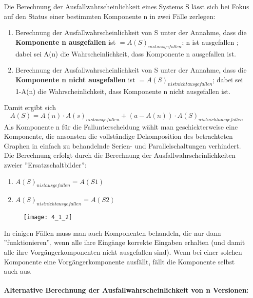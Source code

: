 Die Berechnung der Ausfallwahrscheinlichkeit eines Systems S lässt sich bei Fokus auf den Status einer bestimmten Komponente n in zwei Fälle zerlegen:
\begin{enumerate}
	\item Berechnung der Ausfallwahrscheinlichkeit von S unter der Annahme, dass die \textbf{Komponente n ausgefallen} ist $=A(S)_{n ist ausgefallen}$; n ist ausgefallen  ; dabei sei A(n) die Wahrscheinlichkeit, dass Komponente n ausgefallen ist.
	\item Berechnung der Ausfallwahrscheinlichkeit von S unter der Annahme, dass die \textbf{Komponente n nicht ausgefallen} ist $=A(S)_{n ist nicht ausgefallen}$; dabei sei 1-A(n) die Wahrscheinlichkeit, dass Komponente n nicht ausgefallen ist.
\end{enumerate}
Damit ergibt sich 
\begin{equation}
	A(S)=A(n) \cdot A(s)_{n ist ausgefallen} + (a-A(n)) \cdot A(S)_{n ist nicht ausgefallen}
\end{equation}
Als Komponente n für die Fallunterscheidung wählt man geschickterweise eine Komponente, die ansonsten die vollständige Dekomposition des betrachteten Graphen in  einfach zu behandelnde Serien- und Parallelschaltungen verhindert. Die Berechnung erfolgt durch die Berechnung der Ausfallwahrscheinlichkeiten zweier ''Ersatzschaltbilder'':
\begin{enumerate}
	\item $A(S)_{n ist ausgefallen}=A(S1)$
	\item $A(S)_{n ist nicht ausgefallen}=A(S2)$
\end{enumerate}

\begin{figure}[h]
	\centering
	\texttt{[image: 4\_1\_2]}
\end{figure}

In einigen Fällen muss man auch Komponenten behandeln, die nur dann ''funktionieren'', wenn alle ihre Eingänge korrekte Eingaben erhalten (und damit alle ihre Vorgängerkomponenten nicht ausgefallen sind). Wenn bei einer solchen Komponente eine Vorgängerkomponente ausfällt, fällt die Komponente selbst auch aus.

\paragraph{Alternative Berechnung der Ausfallwahrscheinlichkeit von n Versionen:}

